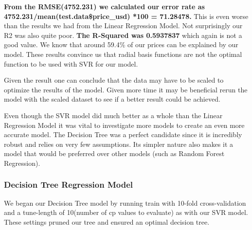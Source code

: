 \documentclass[
]{article}
\newenvironment{Shaded}{\begin{snugshade}}{\end{snugshade}}
\newcommand{\AttributeTok}[1]{\textcolor[rgb]{0.77,0.63,0.00}{#1}}
\newcommand{\CommentTok}[1]{\textcolor[rgb]{0.56,0.35,0.01}{\textit{#1}}}
\newcommand{\DecValTok}[1]{\textcolor[rgb]{0.00,0.00,0.81}{#1}}
\newcommand{\FunctionTok}[1]{\textcolor[rgb]{0.00,0.00,0.00}{#1}}
\newcommand{\NormalTok}[1]{#1}
\newcommand{\OtherTok}[1]{\textcolor[rgb]{0.56,0.35,0.01}{#1}}
\newcommand{\SpecialCharTok}[1]{\textcolor[rgb]{0.00,0.00,0.00}{#1}}
\newcommand{\StringTok}[1]{\textcolor[rgb]{0.31,0.60,0.02}{#1}}
\begin{document}
\textbf{From the RMSE(4752.231) we calculated our error rate as
4752.231/mean(test.data\$price\_usd) *100 = 71.28478.} This is even
worse than the results we had from the Linear Regression Model. Not
surprisingly our R2 was also quite poor. \textbf{The R-Squared was
0.5937837} which again is not a good value. We know that around 59.4\%
of our prices can be explained by our model. These results convince us
that radial basis functions are not the optimal function to be used with
SVR for our model.

Given the result one can conclude that the data may have to be scaled to
optimize the results of the model. Given more time it may be beneficial
rerun the model with the scaled dataset to see if a better result could
be achieved.

Even though the SVR model did much better as a whole than the Linear
Regression Model it was vital to investigate more models to create an
even more accurate model. The Decision Tree was a perfect candidate
since it is incredibly robust and relies on very few assumptions. Its
simpler nature also makes it a model that would be preferred over other
models (such as Random Forest Regression).

\hypertarget{decision-tree-regression-model}{%
\subsubsection{Decision Tree Regression
Model}\label{decision-tree-regression-model}}

We began our Decision Tree model by running train with 10-fold
cross-validation and a tune-length of 10(number of cp values to
evaluate) as with our SVR model. These settings pruned our tree and
ensured an optimal decision tree.

\begin{Shaded}
\end{Shaded}
\end{document}
